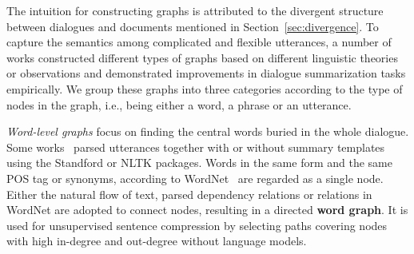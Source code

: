 The intuition for constructing graphs is attributed to the divergent structure between dialogues and documents mentioned in Section~\ref{sec:divergence}. To capture the semantics among complicated and flexible utterances, a number of works constructed different types of graphs based on different linguistic theories or observations and demonstrated improvements in dialogue summarization tasks empirically. We group these graphs into three categories according to the type of 
nodes in the graph, i.e., being either a word, a phrase or an utterance. 

\textit{Word-level graphs} focus on finding the central words buried in the whole dialogue. Some works~\cite{OyaMCN14,banerjee2015generating,shang2018unsupervised,park2022unsupervised} parsed utterances together with or without summary templates using the Standford or NLTK packages. Words in the same form and the same POS tag or synonyms, according to WordNet~\cite{MehdadCTN13} are regarded as a single node. Either the natural flow of text, parsed dependency relations or relations in WordNet are adopted to connect nodes, resulting in a directed \textbf{word graph}. It is used for unsupervised sentence compression by selecting paths covering nodes with high in-degree and out-degree without language models.

